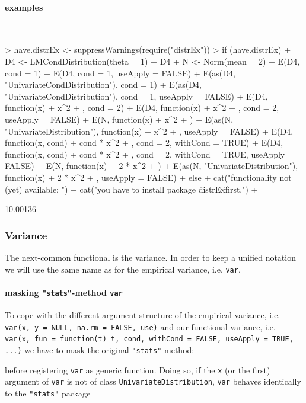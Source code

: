 \documentclass[11pt]{article}
\newcommand{\code}[1]{{\tt #1}}
\newcommand{\pkg}[1]{{\tt "#1"}}
\begin{document}
\paragraph{examples} $ \mbox{ }$\newline
\begin{Schunk}
\begin{Sinput}
> have.distrEx <- suppressWarnings(require("distrEx"))
> if (have.distrEx) {
+     D4 <- LMCondDistribution(theta = 1)
+     D4
+     N <- Norm(mean = 2)
+     E(D4, cond = 1)
+     E(D4, cond = 1, useApply = FALSE)
+     E(as(D4, "UnivariateCondDistribution"), cond = 1)
+     E(as(D4, "UnivariateCondDistribution"), cond = 1, useApply = FALSE)
+     E(D4, function(x) {
+         x^2
+     }, cond = 2)
+     E(D4, function(x) {
+         x^2
+     }, cond = 2, useApply = FALSE)
+     E(N, function(x) {
+         x^2
+     })
+     E(as(N, "UnivariateDistribution"), function(x) {
+         x^2
+     }, useApply = FALSE)
+     E(D4, function(x, cond) {
+         cond * x^2
+     }, cond = 2, withCond = TRUE)
+     E(D4, function(x, cond) {
+         cond * x^2
+     }, cond = 2, withCond = TRUE, useApply = FALSE)
+     E(N, function(x) {
+         2 * x^2
+     })
+     E(as(N, "UnivariateDistribution"), function(x) {
+         2 * x^2
+     }, useApply = FALSE)
+ } else {
+     cat("\n functionality not (yet) available; ")
+     cat("you have to install package \"distrEx\" first.\n")
+ }
\end{Sinput}
\begin{Soutput}
[1] 10.00136
\end{Soutput}
\end{Schunk}
%
%
\subsubsection{Variance}
The next-common functional is the variance. In order to keep a unified
notation we will use the same name as for the empirical variance, i.e. \code{var}.
\paragraph{masking \pkg{stats}-method \code{var}}
To cope with the different argument structure of the empirical variance,
i.e. \code{var(x, y = NULL, na.rm = FALSE, use)}  and our functional variance, i.e.
\code{var(x, fun = function(t) {t}, cond, withCond = FALSE, useApply = TRUE, ...)}
we have to mask the original \pkg{stats}-method:
\begin{Schunk}
\end{Schunk}
before registering \code{var} as generic function.
Doing so, if the \code{x} (or the first) argument of \code{var}
is not of class \code{UnivariateDistribution}, \code{var} behaves identically to
the \pkg{stats} package
\end{document}
